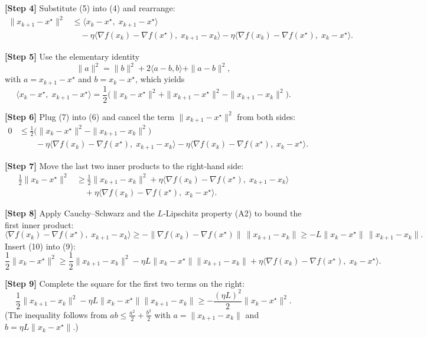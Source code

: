 \documentclass{article}
\begin{document}
\noindent\textbf{[Step 4]} Substitute (5) into (4) and rearrange:
\[
\begin{aligned}
\|x_{k+1}-x^\star\|^2
&\le \langle x_k-x^\star,\;x_{k+1}-x^\star\rangle  \\
&\quad -\eta\langle \nabla f(x_k)-\nabla f(x^\star),\;x_{k+1}-x_k\rangle
-\eta\langle \nabla f(x_k)-\nabla f(x^\star),\;x_k-x^\star\rangle .
\end{aligned}
\tag{6}
\]

\noindent\textbf{[Step 5]} Use the elementary identity
\[
\|a\|^2 = \|b\|^2 + 2\langle a-b, b\rangle + \|a-b\|^2,
\]
with $a=x_{k+1}-x^\star$ and $b=x_k-x^\star$, which yields
\[
\langle x_k-x^\star,\;x_{k+1}-x^\star\rangle
= \frac{1}{2}\bigl(\|x_k-x^\star\|^2+\|x_{k+1}-x^\star\|^2-\|x_{k+1}-x_k\|^2\bigr).
\tag{7}
\]

\noindent\textbf{[Step 6]} Plug (7) into (6) and cancel the term $\|x_{k+1}-x^\star\|^2$ from both sides:
\[
\begin{aligned}
0 &\le \frac{1}{2}\bigl(\|x_k-x^\star\|^2-\|x_{k+1}-x_k\|^2\bigr) \\
&\qquad -\eta\langle \nabla f(x_k)-\nabla f(x^\star),\;x_{k+1}-x_k\rangle
-\eta\langle \nabla f(x_k)-\nabla f(x^\star),\;x_k-x^\star\rangle .
\end{aligned}
\tag{8}
\]

\noindent\textbf{[Step 7]} Move the last two inner products to the right‑hand side:
\[
\begin{aligned}
\frac{1}{2}\|x_k-x^\star\|^2
&\ge \frac{1}{2}\|x_{k+1}-x_k\|^2
+\eta\langle \nabla f(x_k)-\nabla f(x^\star),\;x_{k+1}-x_k\rangle \\
&\quad +\eta\langle \nabla f(x_k)-\nabla f(x^\star),\;x_k-x^\star\rangle .
\end{aligned}
\tag{9}
\]

\noindent\textbf{[Step 8]} Apply Cauchy–Schwarz and the $L$‑Lipschitz property (A2) to bound the first inner product:
\[
\langle \nabla f(x_k)-\nabla f(x^\star),\;x_{k+1}-x_k\rangle
\ge -\|\nabla f(x_k)-\nabla f(x^\star)\|\,\|x_{k+1}-x_k\|
\ge -L\|x_k-x^\star\|\,\|x_{k+1}-x_k\|.
\tag{10}
\]
Insert (10) into (9):
\[
\frac{1}{2}\|x_k-x^\star\|^2
\ge \frac{1}{2}\|x_{k+1}-x_k\|^2
-\eta L\|x_k-x^\star\|\|x_{k+1}-x_k\|
+\eta\langle \nabla f(x_k)-\nabla f(x^\star),\;x_k-x^\star\rangle .
\tag{11}
\]

\noindent\textbf{[Step 9]} Complete the square for the first two terms on the right:
\[
\frac{1}{2}\|x_{k+1}-x_k\|^2-\eta L\|x_k-x^\star\|\|x_{k+1}-x_k\|
\ge -\frac{(\eta L)^2}{2}\|x_k-x^\star\|^2 .
\tag{12}
\]
(The inequality follows from $ab\le\frac{a^2}{2}+\frac{b^2}{2}$ with $a=\|x_{k+1}-x_k\|$ and $b=\eta L\|x_k-x^\star\|$.)
\end{document}
